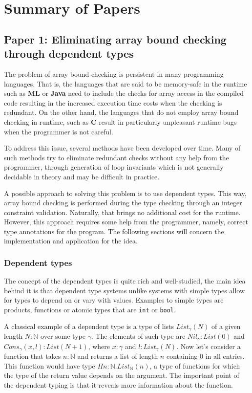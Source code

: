 \documentclass[a4paper,UKenglish]{lipics-v2016}
\begin{document}
\section{Summary of Papers}

\subsection{Paper 1: Eliminating array bound checking through dependent types}

The problem of array bound checking is persistent in many programming
languages. That is, the languages that are said to be memory-safe in the
runtime such as \textbf{ML} or \textbf{Java} need to include the checks for
array access in the compiled code resulting in the increased execution time
costs when the checking is redundant. On the other hand, the languages that do
not employ array bound checking in runtime, such as \textbf{C} result in
particularly unpleasant runtime bugs when the programmer is not careful.

To address this issue, several methods have been developed over time. Many of
such methods try to eliminate redundant checks without any help from the
programmer, through generation of loop invariants which is not generally
decidable in theory and may be difficult in practice.

A possible approach to solving this problem is to use dependent types. This
way, array bound checking is performed during the type checking through an
integer constraint validation. Naturally, that brings no additional cost for
the runtime.  However, this approach requires some help from the programmer,
namely, correct type annotations for the program. The following sections will
concern the implementation and application for the idea.

\subsubsection{Dependent types}

The concept of the dependent types is quite rich and well-studied, the main
idea behind it is that dependent type systems unlike systems with simple types
allow for types to depend on or vary with values. Examples to simple types are
products, functions or atomic types that are \texttt{int} or \texttt{bool}.

A classical example of a dependent type is a type of lists $List_\gamma(N)$ of
a given length $N : \mathbb{N}$ over some type $\gamma$. The elements of such
type are $Nil_\gamma : List(0)$ and $Cons_\gamma(x, l) : List(N+1)$, where $x :
\gamma$ and $l : List_\gamma(N)$. Now let's consider a function that takes $n :
\mathbb{N}$ and returns a list of length $n$ containing $0$ in all entries.
This function would have type $\Pi n : \mathbb{N}.List_\mathbb{N}(n)$, a type
of functions for which the type of the return value depends on the argument.
The important point of the dependent typing is that it reveals more information
about the function.
\end{document}

